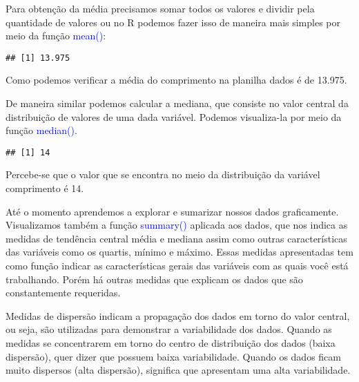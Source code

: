 \documentclass[titlepage, oneside, openany, a4paper]{book}
\newenvironment{Shaded}{\begin{snugshade}}{\end{snugshade}}
\newcommand{\KeywordTok}[1]{\textcolor[rgb]{0.13,0.29,0.53}{\textbf{#1}}}
\newcommand{\NormalTok}[1]{#1}
\newcommand{\OperatorTok}[1]{\textcolor[rgb]{0.81,0.36,0.00}{\textbf{#1}}}
\begin{document}
Para obtenção da média precisamos somar todos os valores e dividir pela quantidade de valores ou no R podemos fazer isso de maneira mais simples por meio da função \textcolor{blue}{mean()}:

\begin{Shaded}
\end{Shaded}

\begin{verbatim}
## [1] 13.975
\end{verbatim}

Como podemos verificar a média do comprimento na planilha dados é de 13.975.

De maneira similar podemos calcular a mediana, que consiste no valor central da distribuição de valores de uma dada variável. Podemos visualiza-la por meio da função \textcolor{blue}{median()}.

\begin{Shaded}
\end{Shaded}

\begin{verbatim}
## [1] 14
\end{verbatim}

Percebe-se que o valor que se encontra no meio da distribuição da variável comprimento é 14.

Até o momento aprendemos a explorar e sumarizar nossos dados graficamente. Visualizamos também a função \textcolor{blue}{summary()} aplicada aos dados, que nos indica as medidas de tendência central média e mediana assim como outras características das variáveis como os quartis, mínimo e máximo. Essas medidas apresentadas tem como função indicar as características gerais das variáveis com as quais você está trabalhando. Porém há outras medidas que explicam os dados que são constantemente requeridas.

Medidas de dispersão indicam a propagação dos dados em torno do valor central, ou seja, são utilizadas para demonstrar a variabilidade dos dados. Quando as medidas se concentrarem em torno do centro de distribuição dos dados (baixa dispersão), quer dizer que possuem baixa variabilidade. Quando os dados ficam muito dispersos (alta dispersão), significa que apresentam uma alta variabilidade.
\end{document}
